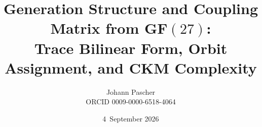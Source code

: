 \documentclass[11pt,a4paper]{report}
\title{Generation Structure and Coupling Matrix from GF$(27)$:\\[0.5em]
  \large Trace Bilinear Form, Orbit Assignment, and CKM Complexity}
\date{4~September 2026}
\author{Johann Pascher\\\small ORCID 0009-0000-6518-4064}
\begin{document}
\renewcommand{\thechapter}{}
\renewcommand{\thesection}{\arabic{section}}
\maketitle
\tableofcontents

\end{document}
